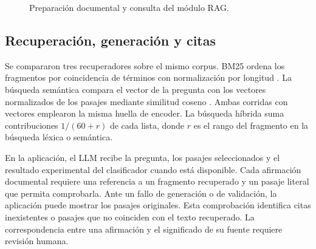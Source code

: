 \begin{figure}[!ht]
\centering
{}
\caption{Preparación documental y consulta del módulo RAG.}
\label{fig:rag-flujo}
\end{figure}

\subsection{Recuperación, generación y citas}
Se compararon tres recuperadores sobre el mismo corpus. BM25 ordena los fragmentos por coincidencia de términos con normalización por longitud \cite{ragrobertson2009}. La búsqueda semántica compara el vector de la pregunta con los vectores normalizados de los pasajes mediante similitud coseno \cite{ragreimers2019}. Ambas corridas con vectores emplearon la misma huella de encoder. La búsqueda híbrida suma contribuciones $1/(60+r)$ de cada lista, donde $r$ es el rango del fragmento en la búsqueda léxica o semántica.

En la aplicación, el LLM recibe la pregunta, los pasajes seleccionados y el resultado experimental del clasificador cuando está disponible. Cada afirmación documental requiere una referencia a un fragmento recuperado y un pasaje literal que permita comprobarla. Ante un fallo de generación o de validación, la aplicación puede mostrar los pasajes originales. Esta comprobación identifica citas inexistentes o pasajes que no coinciden con el texto recuperado. La correspondencia entre una afirmación y el significado de su fuente requiere revisión humana.

